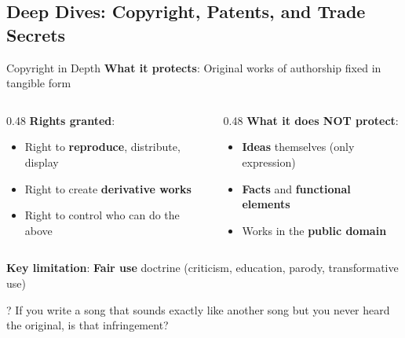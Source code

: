 \documentclass[aspectratio=169]{beamer}
\begin{document}
\subsection{Deep Dives: Copyright, Patents, and Trade Secrets}
\begin{frame}{Copyright in Depth}
\textbf{What it protects}: Original works of authorship fixed in tangible form

\vspace{0.2cm}
\begin{columns}[T]
\begin{column}{0.48\textwidth}
\textbf{Rights granted}:
\begin{itemize}
    \item Right to \textbf{reproduce}, distribute, display
    \item Right to create \textbf{derivative works}
    \item Right to control who can do the above
\end{itemize}
\end{column}

\begin{column}{0.48\textwidth}
\textbf{What it does NOT protect}:
\begin{itemize}
    \item \textbf{Ideas} themselves (only expression)
    \item \textbf{Facts} and \textbf{functional elements}
    \item Works in the \textbf{public domain}
\end{itemize}
\end{column}
\end{columns}

\vspace{0.3cm}
\textbf{Key limitation}: \textbf{Fair use} doctrine (criticism, education, parody, transformative use)

\begin{alertblock}{?}
If you write a song that sounds exactly like another song but you never heard the original, is that infringement?
\end{alertblock}
\end{frame}
\end{document}

